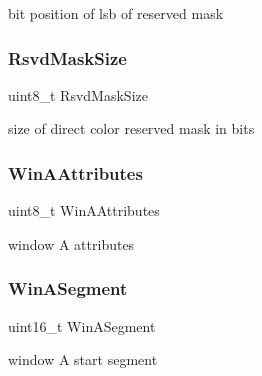 bit position of lsb of reserved mask 

\hypertarget{structvbe__mode__info__t_a87d544680f1132f30b038c0ebf0b829b}{}\label{structvbe__mode__info__t_a87d544680f1132f30b038c0ebf0b829b} 
\subsubsection{\texorpdfstring{Rsvd\+Mask\+Size}{RsvdMaskSize}}
{\footnotesize\ttfamily uint8\+\_\+t Rsvd\+Mask\+Size}



size of direct color reserved mask in bits 

\hypertarget{structvbe__mode__info__t_aaa90049ea7f03763acbbf75240f4f5d8}{}\label{structvbe__mode__info__t_aaa90049ea7f03763acbbf75240f4f5d8} 
\subsubsection{\texorpdfstring{Win\+A\+Attributes}{WinAAttributes}}
{\footnotesize\ttfamily uint8\+\_\+t Win\+A\+Attributes}



window A attributes 

\hypertarget{structvbe__mode__info__t_a99b747099fd4d4271b0f0bc29f31c48f}{}\label{structvbe__mode__info__t_a99b747099fd4d4271b0f0bc29f31c48f} 
\subsubsection{\texorpdfstring{Win\+A\+Segment}{WinASegment}}
{\footnotesize\ttfamily uint16\+\_\+t Win\+A\+Segment}



window A start segment 

\hypertarget{structvbe__mode__info__t_a370ddeb84e904ef1000fe57905ebf6b8}{}\label{structvbe__mode__info__t_a370ddeb84e904ef1000fe57905ebf6b8} 
